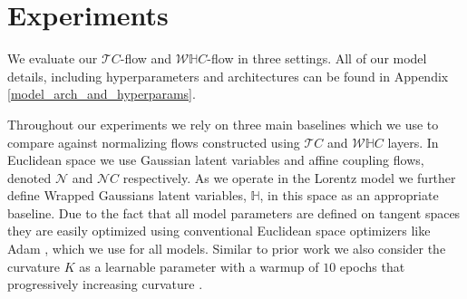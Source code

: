 \section{Experiments}
We evaluate our $\mathcal{T}C$-flow and $\mathcal{W}\mathbb{H}C$-flow in three settings. All of our model details, including hyperparameters and architectures can be found in Appendix \ref{model_arch_and_hyperparams}.

Throughout our experiments we rely on three main baselines which we use to compare against normalizing flows constructed using $\mathcal{T}C$ and $\mathcal{W}\mathbb{H}C$ layers. In Euclidean space we use Gaussian latent variables and affine coupling flows, denoted $\mathcal{N}$ and $\mathcal{N}C$ respectively. As we operate in the Lorentz model we further define Wrapped Gaussians latent variables, $\mathbb{H}$, in this space as an appropriate baseline. Due to the fact that all model parameters are defined on tangent spaces they are easily optimized using conventional Euclidean space optimizers like Adam \cite{kingma2014adam}, which we use for all models. Similar to prior work we also consider the curvature $K$ as a learnable parameter with a warmup of $10$ epochs that progressively increasing curvature \cite{skopek2019mixed}.


